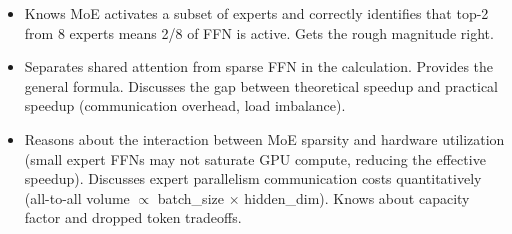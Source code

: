\begin{interviewq}
\goodgreat
\begin{itemize}
    \item {} Knows MoE activates a subset of experts and correctly identifies that top-2 from 8 experts means 2/8 of FFN is active. Gets the rough magnitude right.
    \item {} Separates shared attention from sparse FFN in the calculation. Provides the general formula. Discusses the gap between theoretical speedup and practical speedup (communication overhead, load imbalance).
    \item {} Reasons about the interaction between MoE sparsity and hardware utilization (small expert FFNs may not saturate GPU compute, reducing the effective speedup). Discusses expert parallelism communication costs quantitatively (all-to-all volume $\propto$ batch\_size $\times$ hidden\_dim). Knows about capacity factor and dropped token tradeoffs.
\end{itemize}

\end{interviewq}

